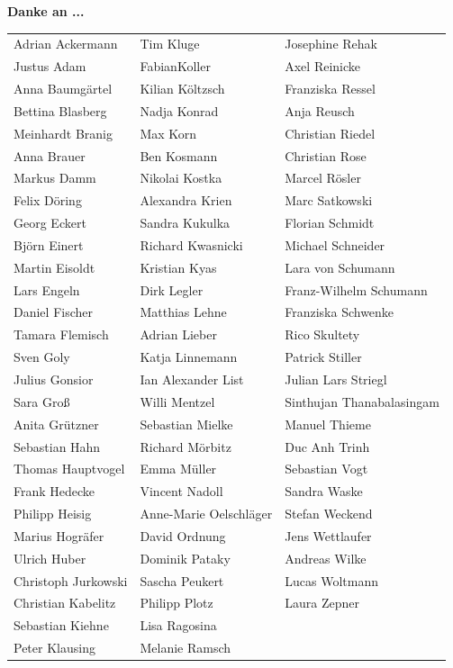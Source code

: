\textbf{Danke an ...}
\\

\begin{tabular}{l l l} 

Adrian Ackermann & Tim Kluge & Josephine Rehak\\
Justus Adam & FabianKoller & Axel Reinicke\\
Anna Baumgärtel & Kilian Költzsch & Franziska Ressel\\
Bettina Blasberg & Nadja Konrad & Anja Reusch\\
Meinhardt Branig & Max Korn & Christian Riedel\\
Anna Brauer & Ben Kosmann & Christian Rose\\
Markus Damm & Nikolai Kostka & Marcel Rösler\\ 
Felix Döring & Alexandra Krien & Marc Satkowski\\ 
Georg Eckert & Sandra Kukulka & Florian Schmidt\\
Björn Einert & Richard Kwasnicki & Michael Schneider\\
Martin Eisoldt & Kristian Kyas & Lara von Schumann\\
Lars Engeln & Dirk Legler & Franz-Wilhelm Schumann\\
Daniel Fischer & Matthias Lehne & Franziska Schwenke\\ 
Tamara Flemisch & Adrian Lieber & Rico Skultety\\
Sven Goly & Katja Linnemann & Patrick Stiller\\
Julius Gonsior & Ian Alexander List & Julian Lars Striegl\\
Sara Groß & Willi Mentzel & Sinthujan Thanabalasingam\\
Anita Grützner & Sebastian Mielke & Manuel Thieme\\
Sebastian Hahn & Richard Mörbitz & Duc Anh Trinh\\
Thomas Hauptvogel & Emma Müller & Sebastian Vogt\\
Frank Hedecke & Vincent Nadoll & Sandra Waske\\
Philipp Heisig & Anne-Marie Oelschläger & Stefan Weckend\\
Marius Hogräfer & David Ordnung & Jens Wettlaufer\\
Ulrich Huber & Dominik Pataky & Andreas Wilke\\
Christoph Jurkowski & Sascha Peukert & Lucas Woltmann\\
Christian Kabelitz & Philipp Plotz & Laura Zepner\\
Sebastian Kiehne & Lisa Ragosina & \\
Peter Klausing & Melanie Ramsch & \\

\end{tabular}

